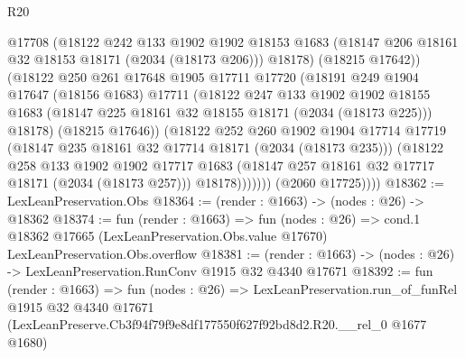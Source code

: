 \begin{lexlean}{R20}
\begin{coremodule}
                    @17708
                    (@18122
                      @242
                      @133
                      @1902
                      @1902
                      @18153
                      @1683
                      (@18147 @206 @18161 @32 @18153 @18171 (@2034 (@18173 @206)))
                      @18178)
                    (@18215 @17642))
                  (@18122
                    @250
                    @261
                    @17648
                    @1905
                    @17711
                    @17720
                    (@18191
                      @249
                      @1904
                      @17647
                      (@18156 @1683)
                      @17711
                      (@18122
                        @247
                        @133
                        @1902
                        @1902
                        @18155
                        @1683
                        (@18147 @225 @18161 @32 @18155 @18171 (@2034 (@18173 @225)))
                        @18178)
                      (@18215 @17646))
                    (@18122
                      @252
                      @260
                      @1902
                      @1904
                      @17714
                      @17719
                      (@18147 @235 @18161 @32 @17714 @18171 (@2034 (@18173 @235)))
                      (@18122
                        @258
                        @133
                        @1902
                        @1902
                        @17717
                        @1683
                        (@18147 @257 @18161 @32 @17717 @18171 (@2034 (@18173 @257)))
                        @18178)))))))
          (@2060 @17725))))
@18362 := LexLeanPreservation.Obs
@18364 := (render : @1663) -> (nodes : @26) -> @18362
@18374 := fun (render : @1663) =>
  fun (nodes : @26) =>
  cond.{1} @18362 @17665 (LexLeanPreservation.Obs.value @17670) LexLeanPreservation.Obs.overflow
@18381 := (render : @1663) -> (nodes : @26) -> LexLeanPreservation.RunConv @1915 @32 @4340 @17671
@18392 := fun (render : @1663) =>
  fun (nodes : @26) =>
  LexLeanPreservation.run_of_funRel
    @1915
    @32
    @4340
    @17671
    (LexLeanPreserve.Cb3f94f79f9e8df177550f627f92bd8d2.R20.__rel_0 @1677 @1680)
\end{coremodule}
\end{lexlean}
